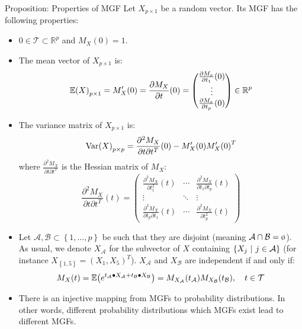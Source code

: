 \documentclass[a4paper]{article}
\begin{document}
\begin{parag}{Proposition: Properties of MGF}
    Let $X_{p\times 1}$ be a random vector. Its MGF has the following properties:
    \begin{itemize}
        \item $0 \in \mathcal{T} \subset \mathbb{R}^p$ and $M_X\left(0\right) = 1$.
        \item The mean vector of $X_{p\times1}$ is: 
        \[\exval\left(X\right)_{p \times 1} = M'_X\left(0\right) = \frac{\partial M_X}{\partial t}\left(0\right) = \begin{pmatrix} \frac{\partial M_x}{\partial t_1} \left(0\right) \\ \vdots \\ \frac{\partial M_x}{\partial t_p} \left(0\right) \end{pmatrix} \in \mathbb{R}^p\]
        
        \item The variance matrix of $X_{p \times 1}$ is: 
        \[\Var\left(X\right)_{p \times p} = \frac{\partial^{2} M_X}{\partial t \partial t^T}\left(0\right) - M'_X\left(0\right) M'_X\left(0\right)^T\]
        where $\frac{\partial^{2} M_X}{\partial t \partial t^T}$ is the Hessian matrix of $M_X$:
        \[\frac{\partial^{2} M_X}{\partial t \partial t^T}\left(t\right) = \begin{pmatrix} \frac{\partial^2 M_X}{\partial t_1^2}\left(t\right)  & \cdots & \frac{\partial^2 M_X}{\partial t_1 \partial t_p}\left(t\right) \\ \vdots & \ddots & \vdots \\ \frac{\partial^2 M_X}{\partial t_p \partial t_1}\left(t\right) & \cdots & \frac{\partial^2 M_X}{\partial t_p^2}\left(t\right) \end{pmatrix} \]
        \item Let $\mathcal{A}, \mathcal{B} \subset \left\{1, \ldots, p\right\}$ be such that they are disjoint (meaning $\mathcal{A} \cap \mathcal{B} = \o$). As usual, we denote $X_{\mathcal{A}}$ for the subvector of $X$ containing $\left\{X_j \suchthat j \in \mathcal{A}\right\}$ (for instance $X_{\left\{1, 5\right\}} = \left(X_1, X_5\right)^T$). $X_{\mathcal{A}}$ and $X_\mathcal{B}$ are independent if and only if: 
        \[M_X\left(t\right) = \exval\left(e^{t_{\mathcal{A}} \dotprod X_{\mathcal{A}} + t_{\mathcal{B}} \dotprod X_{\mathcal{B}}}\right) = M_{X_{\mathcal{A}}}\left(t_{\mathcal{A}}\right) M_{X_{\mathcal{B}}}\left(t_{\mathcal{B}}\right), \mathspace t \in \mathcal{T}\]
        \item There is an injective mapping from MGFs to probability distributions. In other words, different probability distributions which MGFs exist lead to different MGFs.
        \end{itemize}
\end{parag}
\end{document}

